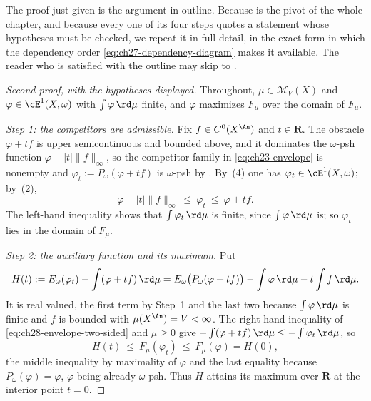 The proof just given is the argument in outline.  Because
 is the pivot of the whole chapter,
and because every one of its four steps quotes a statement whose hypotheses
must be checked, we repeat it in full detail, in the exact form in which the
dependency order \eqref{eq:ch27-dependency-diagram} makes it available.  The
reader who is satisfied with the outline may skip to
.

\begin{proof}[Second proof, with the hypotheses displayed]
Throughout, $\mu\in\mathcal M_V(X)$ and
$\varphi\in\cE^1(X,\omega)$ with $\int\varphi\,\rd\mu$ finite, and
$\varphi$ maximizes $F_\mu$ over the domain of $F_\mu$.

\emph{Step 1: the competitors are admissible.}  Fix
$f\in C^0(X^{\An})$ and $t\in\mathbf R$.  The obstacle
$\varphi+tf$ is upper semicontinuous and bounded above, and it dominates
the $\omega$-psh function $\varphi-|t|\lVert f\rVert_\infty$, so the
competitor family in \eqref{eq:ch23-envelope} is nonempty and
$\varphi_t:=P_\omega(\varphi+tf)$ is $\omega$-psh by
.  By
\,(4) one has
$\varphi_t\in\cE^1(X,\omega)$; by
\,(2),
\begin{equation}
\label{eq:ch28-envelope-two-sided}
 \varphi-|t|\lVert f\rVert_\infty\ \leq\ \varphi_t\ \leq\ \varphi+tf .
\end{equation}
The left-hand inequality shows that $\int\varphi_t\,\rd\mu$ is finite,
since $\int\varphi\,\rd\mu$ is; so $\varphi_t$ lies in the domain of
$F_\mu$.

\emph{Step 2: the auxiliary function and its maximum.}  Put
\[
 H(t):=E_\omega(\varphi_t)-\int(\varphi+tf)\,\rd\mu
      =E_\omega\bigl(P_\omega(\varphi+tf)\bigr)
       -\int\varphi\,\rd\mu-t\int f\,\rd\mu .
\]
It is real valued, the first term by Step~1 and the last two because
$\int\varphi\,\rd\mu$ is finite and $f$ is bounded with
$\mu(X^{\An})=V<\infty$.  The right-hand inequality of
\eqref{eq:ch28-envelope-two-sided} and $\mu\geq0$ give
$-\int(\varphi+tf)\,\rd\mu\leq-\int\varphi_t\,\rd\mu$, so
\[
 H(t)\ \leq\ F_\mu(\varphi_t)\ \leq\ F_\mu(\varphi)=H(0),
\]
the middle inequality by maximality of $\varphi$ and the last equality
because $P_\omega(\varphi)=\varphi$, $\varphi$ being already
$\omega$-psh.  Thus $H$ attains its maximum over $\mathbf R$ at the
interior point $t=0$.


\end{proof}
